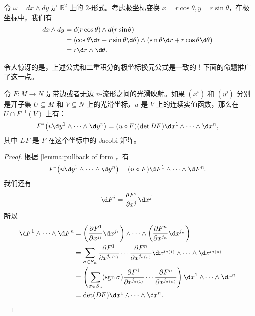 \begin{example}
  令 $\omega=dx\wedge dy$ 是 $\mathbb{R}^2$ 上的 $2$-形式。考虑极坐标变换
  $x=r\cos\theta,y=r\sin\theta$，在极坐标中，我们有
  \begin{align*}
    dx\wedge dy&=d(r\cos\theta)\wedge d(r\sin\theta)\\
    &=(\cos\theta \d r-r\sin\theta\d \theta)\wedge (\sin\theta\d r+r\cos\theta \d\theta)\\
    &=r\d r\wedge\d \theta.
  \end{align*}
\end{example}

令人惊讶的是，上述公式和二重积分的极坐标换元公式是一致的！下面的命题推广了这一点。

\begin{proposition}[满次形式的拉回公式]\label{prop:pullback of top form}
  令 $F:M\to N$ 是带边或者无边 $n$-流形之间的光滑映射。如果 $(x^i)$ 和 $(y^j)$
  分别是开子集 $U\subseteq M$ 和 $V\subseteq N$ 上的光滑坐标，$u$ 是 $V$
  上的连续实值函数，那么在 $U\cap F^{-1}(V)$ 上有：
  \begin{equation}
    F^*\bigl(u\d y^1\wedge\cdots\wedge \d y^n\bigr)
    =(u\circ F) (\det DF)\d x^1\wedge\cdots\wedge \d x^n,
  \end{equation}
  其中 $DF$ 是 $F$ 在这个坐标中的 Jacobi 矩阵。
\end{proposition}
\begin{proof}
  根据 \autoref{lemma:pullback of form}，有
  \[
    F^*\bigl(u\d y^1\wedge\cdots\wedge \d y^n\bigr)
    =(u\circ F) \d F^1\wedge\cdots\wedge \d F^n.
  \]
  我们还有
  \[
    \d F^i=\frac{\partial F^i}{\partial x^j}\d x^j,
  \]
  所以 
  \begin{align*}
        \d F^1\wedge\cdots\wedge\d F^n&=
    \left(\frac{\partial F^1}{\partial x^{j_1}}\d x^{j_1}\right)
    \wedge\cdots\wedge \left(\frac{\partial F^n}{\partial x^{j_n}}\d x^{j_n}\right)\\
    &=\sum_{\sigma\in S_n} \frac{\partial F^1}{\partial x^{j_{\sigma(1)}}}
    \cdots \frac{\partial F^n}{\partial x^{j_{\sigma(n)}}}
    \d x^{j_{\sigma(1)}}\wedge \cdots\wedge \d x^{j_{\sigma(n)}}\\
    &=\left(\sum_{\sigma\in S_n} (\sgn\sigma)\frac{\partial F^1}{\partial x^{j_{\sigma(1)}}}
    \cdots \frac{\partial F^n}{\partial x^{j_{\sigma(n)}}}\right)
    \d x^1\wedge \cdots\wedge \d x^n\\
    &=\det(DF)\d x^1\wedge \cdots\wedge \d x^n.\qedhere
  \end{align*}
\end{proof}

